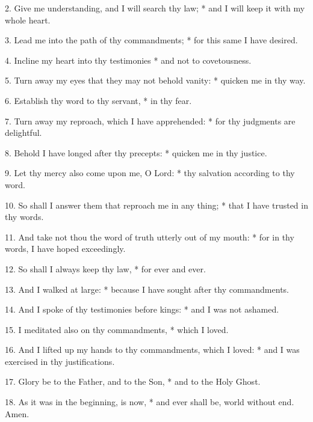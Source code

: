 2. Give me understanding, and I will search thy law; * and I will keep it with my whole heart.

3. Lead me into the path of thy commandments; * for this same I have desired.

4. Incline my heart into thy testimonies * and not to covetousness.

5. Turn away my eyes that they may not behold vanity: * quicken me in thy way.

6. Establish thy word to thy servant, * in thy fear.

7. Turn away my reproach, which I have apprehended: * for thy judgments are delightful.

8. Behold I have longed after thy precepts: * quicken me in thy justice.

9. Let thy mercy also come upon me, O Lord: * thy salvation according to thy word.

10. So shall I answer them that reproach me in any thing; * that I have trusted in thy words.

11. And take not thou the word of truth utterly out of my mouth: * for in thy words, I have hoped exceedingly.

12. So shall I always keep thy law, * for ever and ever.

13. And I walked at large: * because I have sought after thy commandments.

14. And I spoke of thy testimonies before kings: * and I was not ashamed.

15. I meditated also on thy commandments, * which I loved.

16. And I lifted up my hands to thy commandments, which I loved: * and I was exercised in thy justifications.

17. Glory be to the Father, and to the Son, * and to the Holy Ghost.

18. As it was in the beginning, is now, * and ever shall be, world without end. Amen.